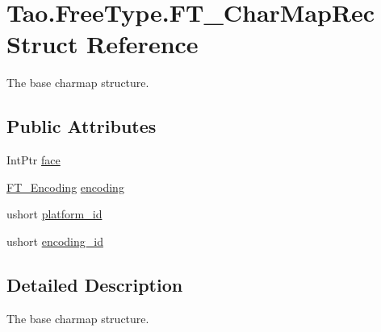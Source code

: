 \hypertarget{struct_tao_1_1_free_type_1_1_f_t___char_map_rec}{
\section{Tao.FreeType.FT\_\-CharMapRec Struct Reference}
\label{struct_tao_1_1_free_type_1_1_f_t___char_map_rec}
}


The base charmap structure.  


\subsection*{Public Attributes}
\begin{DoxyCompactItemize}
\item 
IntPtr \hyperlink{struct_tao_1_1_free_type_1_1_f_t___char_map_rec_a950f625af8a76129a405c8ee6e610633}{face}
\item 
\hyperlink{namespace_tao_1_1_free_type_a87a3c6633d19c2af09744e5a3d0a51ed}{FT\_\-Encoding} \hyperlink{struct_tao_1_1_free_type_1_1_f_t___char_map_rec_a71a60b259a077e779ae0f464dba01c30}{encoding}
\item 
ushort \hyperlink{struct_tao_1_1_free_type_1_1_f_t___char_map_rec_a851cd7ad29f71be6237bae434592b1d2}{platform\_\-id}
\item 
ushort \hyperlink{struct_tao_1_1_free_type_1_1_f_t___char_map_rec_ae85eefd9d84de309db04d5d77015159a}{encoding\_\-id}
\end{DoxyCompactItemize}


\subsection{Detailed Description}
The base charmap structure. 

